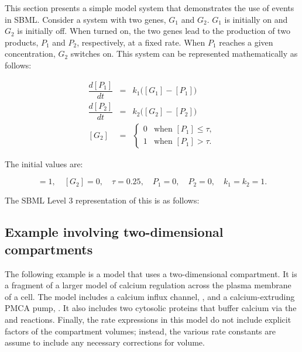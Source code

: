 This section presents a simple model system that demonstrates the
use of events in SBML.  Consider a system with two genes,
$G_1$ and $G_2$.  $G_1$ is initially
on and $G_2$ is initially off.  When turned on, the two
genes lead to the production of two products, $P_1$ and $P_2$,
respectively, at a fixed rate.  When $P_1$ reaches a given
concentration, $G_2$ switches on.  This system can be
represented mathematically as follows:
\begin{linenomath}
\begin{eqnarray*}
  \dfrac{d [P_1]}{d t} & = & k_1 \big([G_1] - [P_1]\big)\\[3pt]
  \dfrac{d [P_2]}{d t} & = & k_2 \big([G_2] - [P_2]\big)\\[0pt]
  [G_2] & = &
    \begin{cases}
      0 & \text{when $[P_1] \leq \tau$},\\
      1 & \text{when $[P_1] > \tau$}.
    \end{cases}
\end{eqnarray*}
\end{linenomath}

The initial values are:
\begin{linenomath}
\begin{equation*}
  [G_1] = 1, \quad [G_2] = 0, \quad \tau = 0.25, \quad P_1 = 0, \quad P_2 = 0, \quad k_1 = k_2 = 1.
\end{equation*}
\end{linenomath}

The SBML Level 3 representation of this is as follows:



\subsection{Example involving two-dimensional compartments}
\label{sec:two-dimensional-eg}

The following example is a model that uses a two-dimensional
compartment.  It is a fragment of a larger model of calcium
regulation across the plasma membrane of a cell.  The model
includes a calcium influx channel, , and a
calcium-extruding PMCA pump, .  It also includes two
cytosolic proteins that buffer calcium via the
 and
 reactions.  Finally, the
rate expressions in this model do not include explicit factors of
the compartment volumes; instead, the various rate constants are
assume to include any necessary corrections for volume.


